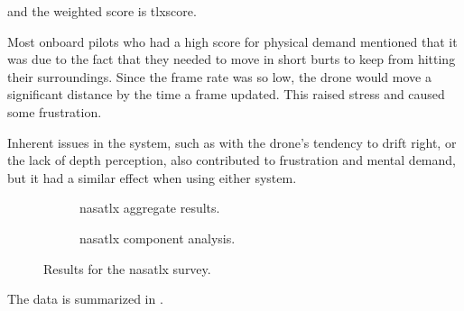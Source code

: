   \noindent and the weighted score is \acrshort{tlxscore}.
  
  Most onboard pilots who had a high score for physical demand mentioned that it was due to the fact that they needed to move in short burts to keep from hitting their surroundings.
  Since the frame rate was so low, the drone would move a significant distance by the time a frame updated.
  This raised stress and caused some frustration.

  Inherent issues in the system, such as with the drone's tendency to drift right, or the lack of depth perception, also contributed to frustration and mental demand, but it had a similar effect when using either system.

  \begin{figure}[h]
    \centering
    \begin{subfigure}[b]{0.45\textwidth}
      
      \caption{\gls{nasatlx} aggregate results.}
      \label{fig:tlx_results}
    \end{subfigure}
    \hfill
    \begin{subfigure}[b]{0.45\textwidth}
      
      \caption{\gls{nasatlx} component analysis.}
      \label{fig:tlx_components}
    \end{subfigure}
    \caption[NASA-TLX results]{Results for the \gls{nasatlx} survey.}
    \label{fig:tlx}
  \end{figure}

  The data is summarized in .

